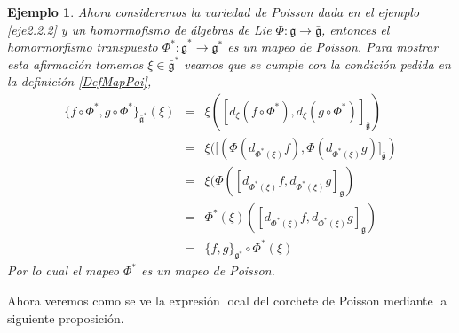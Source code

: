 \documentclass[a4paper,10pt]{book}
\newtheorem{eje}{Ejemplo}[chapter]
\begin{document}
\begin{eje}\label{eje4}
Ahora consideremos la variedad de Poisson dada en el ejemplo \ref{eje2.2.2} y un homormofismo de \'algebras de Lie $\Phi:\mathfrak{g}\to\bar{\mathfrak{g}}$, entonces el homormorfismo transpuesto $\Phi^{*}:\bar{\mathfrak{g}}^{*}\to\mathfrak{g}^{*}$ es un mapeo de Poisson. Para mostrar esta afirmaci\'on tomemos $\xi\in\bar{\mathfrak{g}}^{*}$ veamos que se cumple con la condici\'on pedida
en la definici\'on \ref{DefMapPoi}, 
\begin{eqnarray*}
    \{f\circ\Phi^{*},g\circ\Phi^{*}\}_{\bar{\mathfrak{g}}^{*}}(\xi) & = & \xi([d_{\xi}(f\circ\Phi^{*}),d_{\xi}(g\circ\Phi^{*})]_{\bar{\mathfrak{g}}}) \\
                                                              & = & \xi([(\Phi(d_{\Phi^{*}(\xi)}f),\Phi(d_{\Phi^{*}(\xi)}g)]_{\bar{\mathfrak{g}}})\\
                                                              & = & \xi(\Phi([d_{\Phi^{*}(\xi)}f,d_{\Phi^{*}(\xi)}g]_{\mathfrak{g}})\\
                                                              & = & \Phi^{*}(\xi)([d_{\Phi^{*}(\xi)}f,d_{\Phi^{*}(\xi)}g]_{\mathfrak{g}})\\
                                                              & = & \{f,g\}_{{\mathfrak{g}^{*}}}\circ\Phi^{*}(\xi)
\end{eqnarray*}
Por lo cual el mapeo $\Phi^{*}$ es un mapeo de Poisson.
\end{eje}

Ahora veremos como se ve la expresi\'on local del corchete de Poisson mediante la siguiente proposici\'on.
\end{document}
